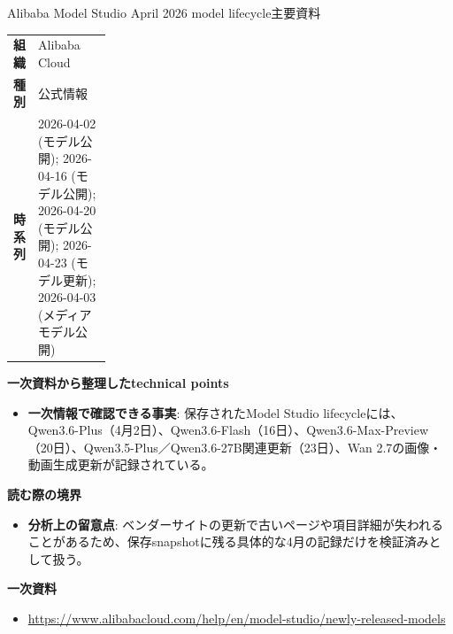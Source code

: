 \begin{technicalnote}{Alibaba Model Studio April 2026 model lifecycle}{主要資料}
\begingroup
\begin{tabularx}{\linewidth}{@{}>{\bfseries}p{0.22\linewidth}X@{}}
組織 & Alibaba Cloud \\
種別 & 公式情報 \\
時系列 & 2026-04-02 (モデル公開); 2026-04-16 (モデル公開); 2026-04-20 (モデル公開); 2026-04-23 (モデル更新); 2026-04-03 (メディアモデル公開) \\
\end{tabularx}
\smallskip
{\bfseries 一次資料から整理したtechnical points}
\begin{itemize}[leftmargin=1.5em,itemsep=0.35em]
\item \textbf{一次情報で確認できる事実}: 保存されたModel Studio lifecycleには、Qwen3.6-Plus（4月2日）、Qwen3.6-Flash（16日）、Qwen3.6-Max-Preview（20日）、Qwen3.5-Plus／Qwen3.6-27B関連更新（23日）、Wan 2.7の画像・動画生成更新が記録されている。
\end{itemize}
\begin{minipage}{\linewidth}
{\bfseries 読む際の境界}
\begin{itemize}[leftmargin=1.5em,itemsep=0.35em]
\item \textbf{分析上の留意点}: ベンダーサイトの更新で古いページや項目詳細が失われることがあるため、保存snapshotに残る具体的な4月の記録だけを検証済みとして扱う。
\end{itemize}
\begin{samepage}
{\bfseries 一次資料}
\begingroup\sloppy
\begin{itemize}[leftmargin=1.5em,itemsep=0.25em]
\item {\scriptsize\url{https://www.alibabacloud.com/help/en/model-studio/newly-released-models}}
\end{itemize}
\endgroup
\end{samepage}
\end{minipage}
\endgroup
\end{technicalnote}
\medskip

